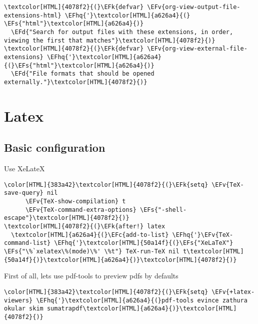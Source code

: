 \documentclass{scrartcl}
\newcommand{\EFk}[1]{\textcolor{EFk}{#1}} %
\newcommand{\EFd}[1]{\textcolor{EFd}{\textit{#1}}} %
\newcommand{\EFs}[1]{\textcolor{EFs}{#1}} %
\newcommand{\EFc}[1]{\textcolor{EFc}{#1}} %
\newcommand{\EFv}[1]{\textcolor{EFv}{#1}} %
\newcommand{\EFhq}[1]{\textcolor{EFhq}{#1}} %
\begin{document}
\begin{Code}
\begin{Verbatim}[]
\textcolor[HTML]{4078f2}{(}\EFk{defvar} \EFv{org-view-output-file-extensions-html} \EFhq{'}\textcolor[HTML]{a626a4}{(} \EFs{"html"}\textcolor[HTML]{a626a4}{)}
  \EFd{"Search for output files with these extensions, in order, viewing the first that matches"}\textcolor[HTML]{4078f2}{)}
\textcolor[HTML]{4078f2}{(}\EFk{defvar} \EFv{org-view-external-file-extensions} \EFhq{'}\textcolor[HTML]{a626a4}{(}\EFs{"html"}\textcolor[HTML]{a626a4}{)}
  \EFd{"File formats that should be opened externally."}\textcolor[HTML]{4078f2}{)}
\end{Verbatim}
\end{Code}

\section{Latex}
\label{sec:org270517c}
\subsection{Basic configuration}
\label{sec:org44f4fae}
Use XeLateX
\begin{Code}
\begin{Verbatim}[]
\color[HTML]{383a42}\textcolor[HTML]{4078f2}{(}\EFk{setq} \EFv{TeX-save-query} nil
      \EFv{TeX-show-compilation} t
      \EFv{TeX-command-extra-options} \EFs{"-shell-escape"}\textcolor[HTML]{4078f2}{)}
\textcolor[HTML]{4078f2}{(}\EFk{after!} latex
  \textcolor[HTML]{a626a4}{(}\EFc{add-to-list} \EFhq{'}\EFv{TeX-command-list} \EFhq{'}\textcolor[HTML]{50a14f}{(}\EFs{"XeLaTeX"} \EFs{"\%`xelatex\%(mode)\%' \%t"} TeX-run-TeX nil t\textcolor[HTML]{50a14f}{)}\textcolor[HTML]{a626a4}{)}\textcolor[HTML]{4078f2}{)}
\end{Verbatim}
\end{Code}

First of all, lets use pdf-tools to preview pdfs by defaults
\begin{Code}
\begin{Verbatim}[]
\color[HTML]{383a42}\textcolor[HTML]{4078f2}{(}\EFk{setq} \EFv{+latex-viewers} \EFhq{'}\textcolor[HTML]{a626a4}{(}pdf-tools evince zathura okular skim sumatrapdf\textcolor[HTML]{a626a4}{)}\textcolor[HTML]{4078f2}{)}
\end{Verbatim}
\end{Code}
\end{document}
